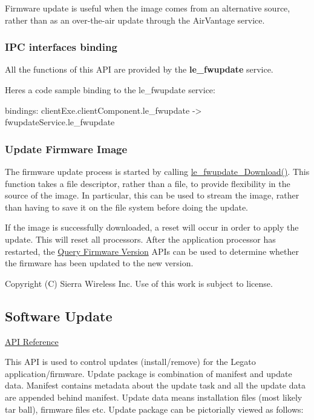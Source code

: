 Firmware update is useful when the image comes from an alternative source, rather than as an over-\/the-\/air update through the Air\+Vantage service.\hypertarget{c_fwupdate_le_fwupdate_binding}{}\subsubsection{I\+P\+C interfaces binding}\label{c_fwupdate_le_fwupdate_binding}
All the functions of this A\+P\+I are provided by the {\bfseries le\+\_\+fwupdate} service.

Here\textquotesingle{}s a code sample binding to the le\+\_\+fwupdate service\+: \begin{DoxyVerb}bindings:
{
   clientExe.clientComponent.le_fwupdate -> fwupdateService.le_fwupdate
}
\end{DoxyVerb}
\hypertarget{c_fwupdate_le_fwupdate_image}{}\subsubsection{Update Firmware Image}\label{c_fwupdate_le_fwupdate_image}
The firmware update process is started by calling \hyperlink{le__fwupdate__interface_8h_ab68f3a7c5d4284306468e888bf6a8796}{le\+\_\+fwupdate\+\_\+\+Download()}. This function takes a file descriptor, rather than a file, to provide flexibility in the source of the image. In particular, this can be used to stream the image, rather than having to save it on the file system before doing the update.

If the image is successfully downloaded, a reset will occur in order to apply the update. This will reset all processors. After the application processor has restarted, the \hyperlink{c_info_le_info_version}{Query Firmware Version} A\+P\+Is can be used to determine whether the firmware has been updated to the new version.





Copyright (C) Sierra Wireless Inc. Use of this work is subject to license. \hypertarget{c_update}{}\subsection{Software Update}\label{c_update}
\hyperlink{le__update__interface_8h}{A\+P\+I Reference}





This A\+P\+I is used to control updates (install/remove) for the Legato application/firmware. Update package is combination of manifest and update data. Manifest contains metadata about the update task and all the update data are appended behind manifest. Update data means installation files (most likely tar ball), firmware files etc. Update package can be pictorially viewed as follows\+:


